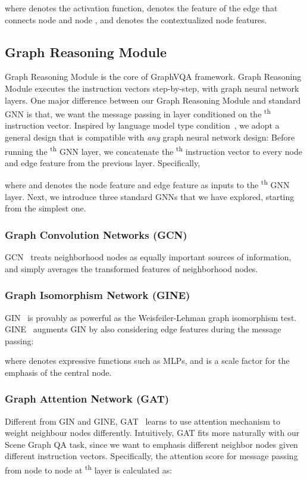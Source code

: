 \documentclass[11pt]{article}
\begin{document}
where  denotes the activation function,   denotes the feature of the edge that connects node  and node , 
and  denotes the contextualized node features. 



\subsection{Graph Reasoning Module}
\label{subsec:GraphReasoning}
Graph Reasoning Module is the core of GraphVQA framework. 
Graph Reasoning Module executes the  instruction vectors step-by-step, with  graph neural network layers. 
One major difference between our Graph Reasoning Module and standard GNN is that, we want the message passing in layer  conditioned on the \textsuperscript{th} instruction vector. Inspired by language model type condition~\cite{MOSS}, we adopt a general design that is compatible with \emph{any} graph neural network design: 
Before running the \textsuperscript{th} GNN layer, we concatenate the \textsuperscript{th} instruction vector to every node and edge feature from the previous layer. Specifically, 

where  and  denotes the node feature and edge feature as inputs to the \textsuperscript{th} GNN layer. 
Next, we introduce three standard GNNs that we have explored, starting from the simplest one. 



\subsubsection{Graph Convolution Networks (GCN)}
\label{subsubsec:gcn}
GCN~\cite{gcn} treats neighborhood nodes as equally important sources of information, and simply averages the transformed features of neighborhood nodes.  



\subsubsection{Graph Isomorphism Network (GINE)}
\label{subsubsec:gine}
GIN~\cite{GIN} is provably as powerful as the Weisfeiler-Lehman graph isomorphism test. 
GINE~\cite{GINE} augments GIN by also considering edge features during the message passing: 

where  denotes expressive functions such as MLPs, and  is a scale factor for the emphasis of the central node. 


\subsubsection{Graph Attention Network (GAT)}
Different from GIN and GINE, GAT~\cite{gat} learns to use attention mechanism to weight neighbour nodes differently. 
Intuitively, GAT fits more naturally with our Scene Graph QA task, since we want to emphasis different neighbor nodes given different instruction vectors. Specifically, the attention score  for message passing from node  to node  at \textsuperscript{th} layer is calculated as:
\end{document}
